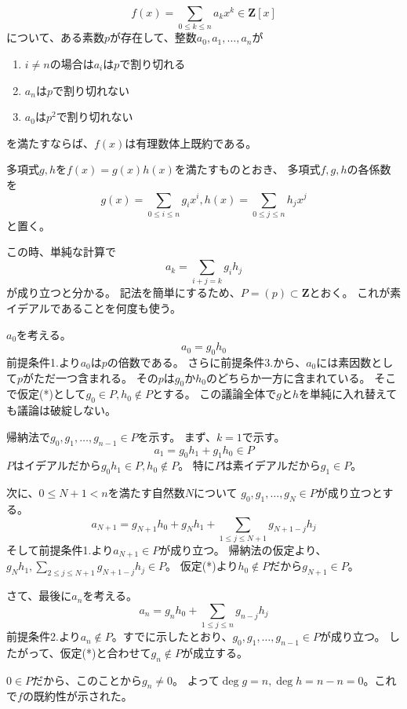 \documentclass[a4j]{jarticle}
\begin{document}
\begin{Them}
\[ f(x)=\sum_{0 \leq k \leq n}{a_k x^k} \in \mathbf{Z}[x] \]
について、ある素数$p$が存在して、整数$a_0, a_1, \dots, a_n$が
    \begin{enumerate}
    \item $i \neq n$の場合は$a_i$は$p$で割り切れる
    \item $a_n$は$p$で割り切れない
    \item $a_0$は$p^2$で割り切れない
    \end{enumerate}
を満たすならば、$f(x)$は有理数体上既約である。
\end{Them}
\begin{Proof}
多項式$g,h$を$f(x)=g(x) h(x)$を満たすものとおき、
多項式$f, g, h$の各係数を
\[ g(x)=\sum_{0 \leq i \leq n}{g_i x^i}, h(x)=\sum_{0 \leq j \leq n}{h_j x^j} \]
と置く。

この時、単純な計算で
\[ a_{k}=\sum_{i+j=k}{g_i h_j} \]
が成り立つと分かる。
記法を簡単にするため、$P=(p) \subset \mathbf{Z}$とおく。
これが素イデアルであることを何度も使う。

$a_0$を考える。
\[ a_0=g_0 h_0 \]
前提条件1.より$a_0$は$p$の倍数である。
さらに前提条件3.から、$a_0$には素因数として$p$がただ一つ含まれる。
その$p$は$g_0$か$h_0$のどちらか一方に含まれている。
そこで仮定(*)として$g_0 \in P, h_0 \not \in P$とする。
この議論全体で$g$と$h$を単純に入れ替えても議論は破綻しない。

帰納法で$g_0, g_1, \dots, g_{n-1} \in P$を示す。
まず、$k=1$で示す。
\[ a_1=g_0 h_1 + g_1 h_0 \in P \]
$P$はイデアルだから$g_0 h_1 \in P, h_0 \not \in P$。
特に$P$は素イデアルだから$g_1 \in P$。

次に、$0 \leq N+1 < n$を満たす自然数$N$について
$g_0, g_1, \dots, g_{N} \in P$が成り立つとする。
\[ a_{N+1}=g_{N+1} h_0+g_{N} h_1+\sum_{1 \leq j \leq N+1}{g_{N+1-j} h_j } \]
そして前提条件1.より$a_{N+1} \in P$が成り立つ。
帰納法の仮定より、$g_{N} h_1, \sum_{2 \leq j \leq N+1}{g_{N+1-j} h_j } \in P$。
仮定(*)より$h_0 \not \in P$だから$g_{N+1} \in P$。

さて、最後に$a_n$を考える。
\[ a_{n}=g_{n} h_0+\sum_{1 \leq j \leq n}{g_{n-j} h_j } \]
前提条件2.より$a_{n} \not \in P$。すでに示したとおり、$g_0, g_1, \dots, g_{n-1} \in P$が成り立つ。
したがって、仮定(*)と合わせて$g_n \not \in P$が成立する。

$0 \in P$だから、このことから$g_n \neq 0$。
よって$\deg g=n, \deg h=n-n=0$。これで$f$の既約性が示された。
\QED
\end{Proof}
\end{document}
